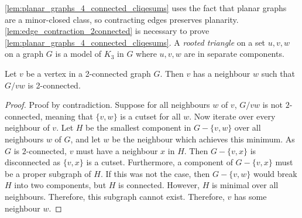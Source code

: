 \cref{lem:planar_graphs_4_connected_cliqesums} uses the fact that planar graphs are a minor-closed class, so contracting edges preserves planarity. \cref{lem:edge_contraction_2connected} is necessary to prove \cref{lem:planar_graphs_4_connected_cliqesums}. A \textit{rooted triangle} on a set $u, v, w$ on a graph $G$ is a model of $K_3$ in $G$ where $u, v, w$ are in separate components. 

\begin{lemma}\label{lem:edge_contraction_2connected}
	Let $v$ be a vertex in a 2-connected graph $G$. Then $v$ has a neighbour $w$ such that $G/vw$ is 2-connected.
\end{lemma}
\begin{proof}
	Proof by contradiction. Suppose for all neighbours $w$ of $v$, $G/vw$ is not $2$-connected, meaning that $\{v,w\}$ is a cutset for all $w$. Now iterate over every neighbour of $v$. Let $H$ be the smallest component in $G - \{v,w\}$ over all neighbours $w$ of $G$, and let $w$ be the neighbour which achieves this minimum. As $G$ is $2$-connected, $v$ must have a neighbour $x$ in $H$. Then $G - \{v, x\}$ is disconnected as $\{v,x\}$ is a cutset. Furthermore, a component of $G - \{v,x\}$ must be a proper subgraph of $H$. If this was not the case, then $G - \{v,w\}$ would break $H$ into two components, but $H$ is connected. However, $H$ is minimal over all neighbours. Therefore, this subgraph cannot exist. Therefore, $v$ has some neighbour $w$. 
\end{proof}

